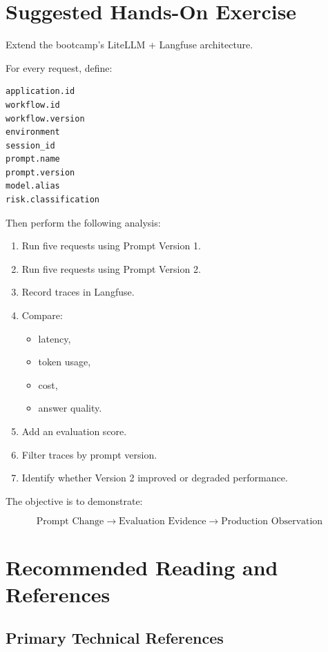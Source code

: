 \documentclass[11pt,a4paper]{article}
\begin{document}
\section{Suggested Hands-On Exercise}

Extend the bootcamp's LiteLLM + Langfuse architecture.

For every request, define:

\begin{lstlisting}
application.id
workflow.id
workflow.version
environment
session_id
prompt.name
prompt.version
model.alias
risk.classification
\end{lstlisting}

Then perform the following analysis:

\begin{enumerate}
\item Run five requests using Prompt Version 1.
\item Run five requests using Prompt Version 2.
\item Record traces in Langfuse.
\item Compare:
\begin{itemize}
\item latency,
\item token usage,
\item cost,
\item answer quality.
\end{itemize}
\item Add an evaluation score.
\item Filter traces by prompt version.
\item Identify whether Version 2 improved or degraded performance.
\end{enumerate}

The objective is to demonstrate:

\[
\boxed{
\text{Prompt Change}
\rightarrow
\text{Evaluation Evidence}
\rightarrow
\text{Production Observation}
}
\]

\section{Recommended Reading and References}

\subsection*{Primary Technical References}
\end{document}
